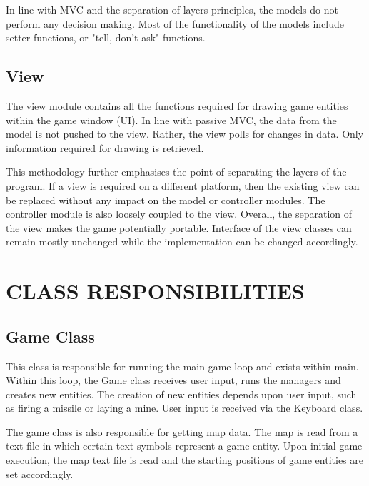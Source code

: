 \documentclass[10pt,twocolumn]{witseiepaper}
\begin{document}
In line with MVC and the separation of layers principles, the models do not perform any decision making. Most of the functionality of the models include setter functions, or "tell, don't ask" functions.

\subsection{View}
The view module contains all the functions required for drawing game entities within the game window (UI). In line with passive MVC, the data from the model is not pushed to the view. Rather, the view polls for changes in data. Only information required for drawing is retrieved. 

This methodology further emphasises the point of separating the layers of the program. If a view is required on a different platform, then the existing view can be replaced without any impact on the model or controller modules. The controller module is also loosely coupled to the view. Overall, the separation of the view makes the game potentially portable. Interface of the view classes can remain mostly unchanged while the implementation can be changed accordingly.

%
\section{CLASS RESPONSIBILITIES} %



\subsection{Game Class} 
This class is responsible for running the main game loop and exists within main. Within this loop, the Game class receives user input, runs the managers and creates new entities. The creation of new entities depends upon user input, such as firing a missile or laying a mine. User input is received via the Keyboard class.

The game class is also responsible for getting map data. The map is read from a text file in which certain text symbols represent a game entity. Upon initial game execution, the map text file is read and the starting positions of game entities are set accordingly. 
\end{document}

